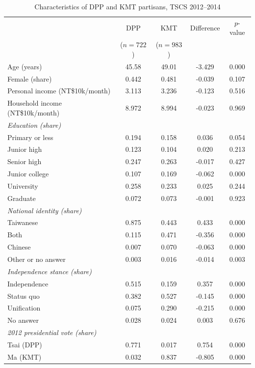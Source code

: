 \begin{table}[htbp]
\centering
\caption{Characteristics of DPP and KMT partisans, TSCS 2012--2014}
\label{tab:descriptives}
\small
\begin{tabular}{lcccc}
\toprule
 & DPP & KMT & Difference & $p$-value \\ & ($n=722$) & ($n=983$) & & \\
\midrule
Age (years) & 45.58 & 49.01 & -3.429 & 0.000 \\
Female (share) & 0.442 & 0.481 & -0.039 & 0.107 \\
Personal income (NT\$10k/month) & 3.113 & 3.236 & -0.123 & 0.516 \\
Household income (NT\$10k/month) & 8.972 & 8.994 & -0.023 & 0.969 \\
\multicolumn{5}{l}{\textit{Education (share)}} \\
\quad Primary or less & 0.194 & 0.158 & 0.036 & 0.054 \\
\quad Junior high & 0.123 & 0.104 & 0.020 & 0.213 \\
\quad Senior high & 0.247 & 0.263 & -0.017 & 0.427 \\
\quad Junior college & 0.107 & 0.169 & -0.062 & 0.000 \\
\quad University & 0.258 & 0.233 & 0.025 & 0.244 \\
\quad Graduate & 0.072 & 0.073 & -0.001 & 0.923 \\
\multicolumn{5}{l}{\textit{National identity (share)}} \\
\quad Taiwanese & 0.875 & 0.443 & 0.433 & 0.000 \\
\quad Both & 0.115 & 0.471 & -0.356 & 0.000 \\
\quad Chinese & 0.007 & 0.070 & -0.063 & 0.000 \\
\quad Other or no answer & 0.003 & 0.016 & -0.014 & 0.003 \\
\multicolumn{5}{l}{\textit{Independence stance (share)}} \\
\quad Independence & 0.515 & 0.159 & 0.357 & 0.000 \\
\quad Status quo & 0.382 & 0.527 & -0.145 & 0.000 \\
\quad Unification & 0.075 & 0.290 & -0.215 & 0.000 \\
\quad No answer & 0.028 & 0.024 & 0.003 & 0.676 \\
\multicolumn{5}{l}{\textit{2012 presidential vote (share)}} \\
\quad Tsai (DPP) & 0.771 & 0.017 & 0.754 & 0.000 \\
\quad Ma (KMT) & 0.032 & 0.837 & -0.805 & 0.000 \\

\end{tabular}
\end{table}
